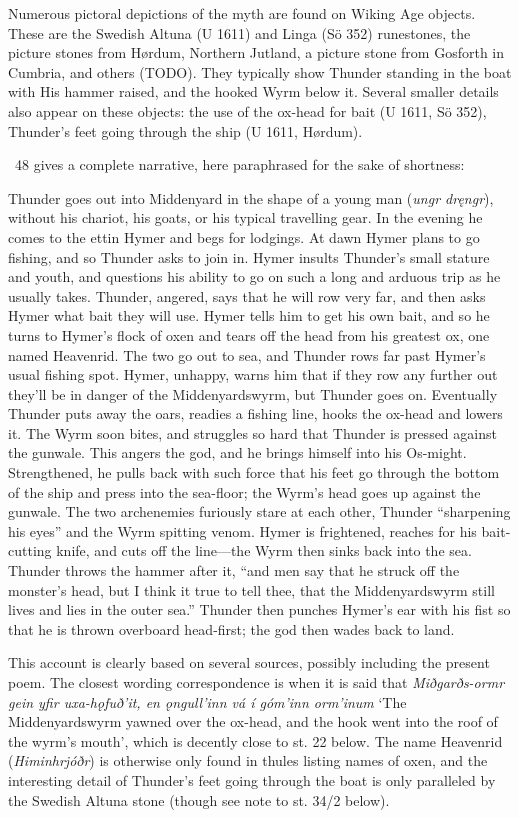 Numerous pictoral depictions of the myth are found on Wiking Age objects.  These are the Swedish Altuna (U 1611) and Linga (Sö 352) runestones, the picture stones from Hørdum, Northern Jutland, a picture stone from Gosforth in Cumbria, and others (TODO).  They typically show Thunder standing in the boat with His hammer raised, and the hooked Wyrm below it.  Several smaller details also appear on these objects: the use of the ox-head for bait (U 1611, Sö 352), Thunder’s feet going through the ship (U 1611, Hørdum).

\Gylfaginning\ 48 gives a complete narrative, here paraphrased for the sake of shortness:

{\small Thunder goes out into Middenyard in the shape of a young man (\emph{ungr dręngr}), without his chariot, his goats, or his typical travelling gear.  In the evening he comes to the ettin Hymer and begs for lodgings.  At dawn Hymer plans to go fishing, and so Thunder asks to join in.  Hymer insults Thunder's small stature and youth, and questions his ability to go on such a long and arduous trip as he usually takes.  Thunder, angered, says that he will row very far, and then asks Hymer what bait they will use.  Hymer tells him to get his own bait, and so he turns to Hymer’s flock of oxen and tears off the head from his greatest ox, one named Heavenrid.  The two go out to sea, and Thunder rows far past Hymer's usual fishing spot.  Hymer, unhappy, warns him that if they row any further out they'll be in danger of the Middenyardswyrm, but Thunder goes on.  Eventually Thunder puts away the oars, readies a fishing line, hooks the ox-head and lowers it.  The Wyrm soon bites, and struggles so hard that Thunder is pressed against the gunwale.  This angers the god, and he brings himself into his Os-might.  Strengthened, he pulls back with such force that his feet go through the bottom of the ship and press into the sea-floor; the Wyrm's head goes up against the gunwale.  The two archenemies furiously stare at each other, Thunder “sharpening his eyes” and the Wyrm spitting venom.  Hymer is frightened, reaches for his bait-cutting knife, and cuts off the line—the Wyrm then sinks back into the sea.  Thunder throws the hammer after it, “and men say that he struck off the monster’s head, but I think it true to tell thee, that the Middenyardswyrm still lives and lies in the outer sea.”  Thunder then punches Hymer’s ear with his fist so that he is thrown overboard head-first; the god then wades back to land.}

This account is clearly based on several sources, possibly including the present poem.  The closest wording correspondence is when it is said that \emph{Miðgarðs-ormr gein yfir uxa-hǫfuð’it, en ǫngull’inn vá í góm’inn orm’inum} ‘The Middenyardswyrm yawned over the ox-head, and the hook went into the roof of the wyrm’s mouth’, which is decently close to st. 22 below.  The name Heavenrid (\emph{Himinhrjóðr}) is otherwise only found in thules listing names of oxen, and the interesting detail of Thunder’s feet going through the boat is only paralleled by the Swedish Altuna stone (though see note to st. 34/2 below).

